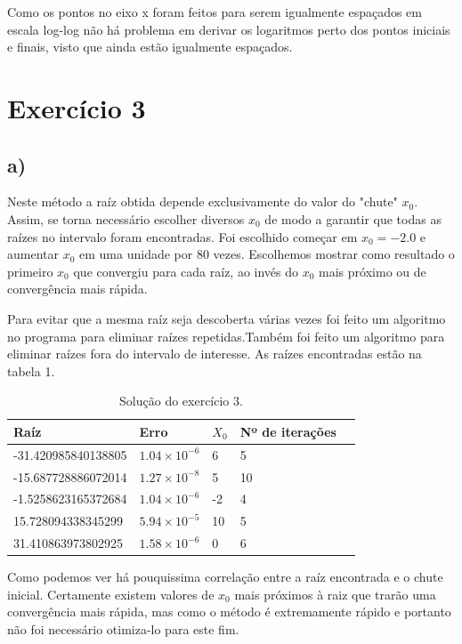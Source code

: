 \documentclass[a4wide]{report}
\begin{document}
Como os pontos no eixo x foram feitos para serem igualmente espaçados em escala log-log não há problema em derivar os logaritmos perto dos pontos iniciais e finais, visto que ainda estão igualmente espaçados.




\section*{Exercício 3}
\subsection*{a)}
Neste método a raíz obtida depende exclusivamente do valor do "chute" $x_{0}$. Assim, se torna necessário escolher diversos $x_{0}$ de modo a garantir que todas as raízes no intervalo foram encontradas. Foi escolhido começar em $x_{0} = -2.0 $ e aumentar $x_{0}$ em uma unidade por 80 vezes. Escolhemos mostrar como resultado o primeiro $x_{0}$ que convergiu para cada raíz, ao invés do $x_{0}$ mais próximo ou de convergência mais rápida. 

Para evitar que a mesma raíz seja descoberta várias vezes foi feito um algoritmo no programa para eliminar raízes repetidas.Também foi feito um algoritmo para eliminar raízes fora do intervalo de interesse. As raízes encontradas estão na tabela 1.

\begin{table}[]
\centering

\begin{tabular}{lllll}
\hline
Raíz                & Erro                    & $X_{0}$ & Nº de iterações &  \\
\hline
-31.420985840138805 & $1.04\times 10^{-6}$ &  6         & 5               &  \\
\hline
-15.687728886072014 & $1.27\times 10^{-8}$ &  5         & 10              &  \\
\hline
-1.5258623165372684 & $1.04\times 10^{-6}$ & -2         & 4               &  \\
\hline
 15.728094338345299 & $5.94\times 10^{-5}$ & 10         & 5               &  \\
 \hline
 31.410863973802925 & $1.58\times 10^{-6}$ & 0          & 6               & 
\end{tabular}
\label{tabela3}
\caption{Solução do exercício 3.}
\end{table}

Como podemos ver há pouquissima correlação entre a raíz encontrada e o chute inicial. Certamente existem valores de $x_{0}$ mais próximos à raiz que trarão uma convergência mais rápida, mas como o método é extremamente rápido e portanto não foi necessário otimiza-lo para este fim.
\end{document}
